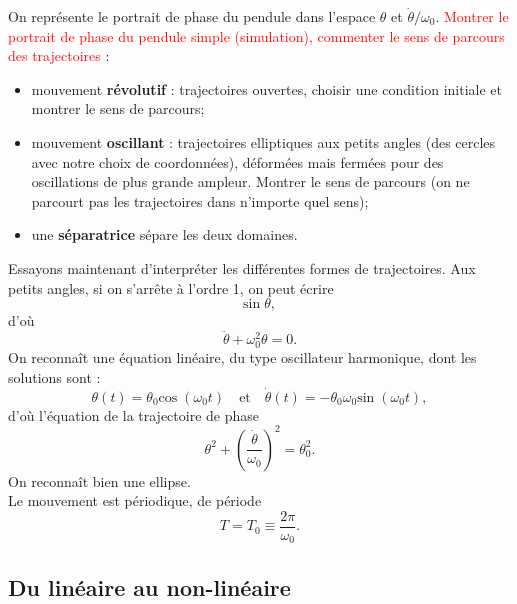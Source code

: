 \documentclass[11pt,a4paper]{report}
\begin{document}
On représente le portrait de phase du pendule dans l'espace $\theta$ et $\dot{\theta}/\omega_0$. \textcolor{red}{Montrer le portrait de phase du pendule simple (simulation), commenter le sens de parcours des trajectoires} :
\begin{itemize}
	\item mouvement \textbf{révolutif} : trajectoires ouvertes, choisir une condition initiale 				et montrer le sens de parcours;\\
	\item mouvement \textbf{oscillant} : trajectoires elliptiques aux petits angles (des 				cercles avec notre choix de coordonnées), déformées mais fermées pour des oscillations 			de plus grande ampleur. Montrer le sens de parcours (on ne parcourt pas les 					trajectoires dans n'importe quel sens);\\
	\item une \textbf{séparatrice} sépare les deux domaines.\\
\end{itemize}

Essayons maintenant d'interpréter les différentes formes de trajectoires. Aux petits angles, si on s'arrête à l'ordre 1, on peut écrire
\begin{equation}
	\text{sin}\;\theta,
\end{equation}
d'où 
\begin{equation}
	\ddot{\theta} + \omega_0^2\theta = 0.
\end{equation}
On reconnaît une équation linéaire, du type oscillateur harmonique, dont les solutions sont :
\begin{equation}
	\theta (t) = \theta_0 \text{cos}\; (\omega_0 t) \quad\text{et}\quad
	\dot{\theta}(t) = - \theta_0 \omega_0 \text{sin}\;(\omega_0 t),
\end{equation}
d'où l'équation de la trajectoire de phase
\begin{equation}
	\boxed{\theta^2 + \left(\frac{\dot{\theta}}{\omega_0}\right)^2 = \theta_0^2}.
\end{equation}
On reconnaît bien une ellipse.\\

Le mouvement est périodique, de période
\begin{equation}
	T = T_0 \equiv \frac{2\pi}{\omega_0}.
\end{equation}

\subsection{Du linéaire au non-linéaire}
\end{document}
